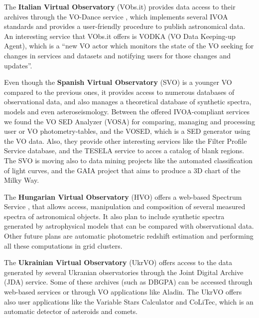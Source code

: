 The \textbf{Italian Virtual Observatory} (VObs.it) provides data access to
their archives through the VO-Dance service \cite{},
which implements several IVOA standards and provides a user-friendly procedure 
to publish astronomical data. An interesting service that VObs.it offers is
VODKA (VO Data Keeping-up Agent), which is a ``new VO actor which monitors the
state of the VO seeking for changes in services and datasets and notifying users
for those changes and updates''. \cite{}

Even though the \textbf{Spanish Virtual Observatory} (SVO) is a younger VO
compared to the previous ones, it
provides access to numerous databases of observational data, and also manages a
theoretical database of synthetic spectra, models and even asteroseismology.
Between the offered IVOA-compliant services we found the VO SED Analyzer (VOSA)
for comparing, managing and processing user or VO photometry-tables,
and the VOSED, which is a SED generator using the VO data.
Also, they provide other interesting services like the Filter Profile Service
database, and the TESELA service \cite{} to acces a catalog of blank regions.
The SVO is moving also to data mining projects like the automated classification
of light curves, and the GAIA project that aims to produce a 3D chart of the 
Milky Way. 

The \textbf{Hungarian Virtual Observatory} (HVO) offers a web-based Spectrum
Service \cite{},
that allows access, manipulation and composition of
several measured spectra of astronomical objects. It
also plan to include synthetic spectra generated by
astrophysical models that can be compared with observational
data. Other future plans are automatic photometric redshift 
estimation and performing all these computations in grid clusters. 

The \textbf{Ukrainian Virtual Observatory} (UkrVO)
offers access to the data generated by several Ukranian observatories 
through the Joint Digital Archive (JDA) service. Some of these archives 
(such as DBGPA)
can be accessed through web-based services or through VO applications like
Aladin. The UkrVO offers also user applications like the Variable Stars
Calculator and CoLiTec, which is an automatic detector of asteroids and
comets.

